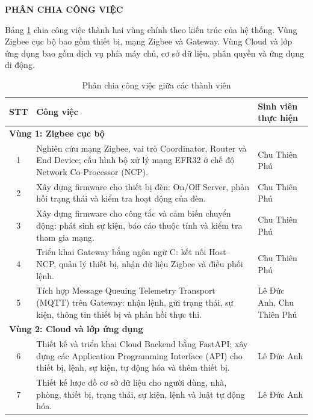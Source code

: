 \begin{center}
{\Large\bfseries PHÂN CHIA CÔNG VIỆC}
\end{center}
{}
\label{sec:duty-roster}

Bảng \ref{tab:duty-roster} chia công việc thành hai vùng chính theo kiến trúc của hệ thống. Vùng Zigbee cục bộ bao gồm thiết bị, mạng Zigbee và Gateway. Vùng Cloud và lớp ứng dụng bao gồm dịch vụ phía máy chủ, cơ sở dữ liệu, phân quyền và ứng dụng di động.

\begin{table}[H]
\centering
\caption{Phân chia công việc giữa các thành viên}
\label{tab:duty-roster}
\small
\setlength{\tabcolsep}{4pt}
\begin{tabular}{|c|>{\raggedright\arraybackslash}p{9.2cm}|>{\centering\arraybackslash}p{3.4cm}|}
\hline
\textbf{STT} & \textbf{Công việc} & \textbf{Sinh viên thực hiện} \\ \hline
\multicolumn{3}{|l|}{\textbf{Vùng 1: Zigbee cục bộ}} \\ \hline
1 & Nghiên cứu mạng Zigbee, vai trò Coordinator, Router và End Device; cấu hình bộ xử lý mạng EFR32 ở chế độ Network Co-Processor (NCP). & Chu Thiên Phú \\ \hline
2 & Xây dựng firmware cho thiết bị đèn: On/Off Server, phản hồi trạng thái và kiểm tra hoạt động của đèn. & Chu Thiên Phú \\ \hline
3 & Xây dựng firmware cho công tắc và cảm biến chuyển động: phát sinh sự kiện, báo cáo thuộc tính và kiểm tra tham gia mạng. & Chu Thiên Phú \\ \hline
4 & Triển khai Gateway bằng ngôn ngữ C: kết nối Host--NCP, quản lý thiết bị, nhận dữ liệu Zigbee và điều phối lệnh. & Chu Thiên Phú \\ \hline
5 & Tích hợp Message Queuing Telemetry Transport (MQTT) trên Gateway: nhận lệnh, gửi trạng thái, sự kiện, thông tin thiết bị và phản hồi thực thi. & Lê Đức Anh, Chu Thiên Phú \\ \hline
\multicolumn{3}{|l|}{\textbf{Vùng 2: Cloud và lớp ứng dụng}} \\ \hline
6 & Thiết kế và triển khai Cloud Backend bằng FastAPI; xây dựng các Application Programming Interface (API) cho thiết bị, lệnh, sự kiện, tự động hóa và thêm thiết bị. & Lê Đức Anh \\ \hline
7 & Thiết kế lược đồ cơ sở dữ liệu cho người dùng, nhà, phòng, thiết bị, trạng thái, sự kiện, lệnh và luật tự động hóa. & Lê Đức Anh \\ \hline

\end{tabular}
\end{table}
